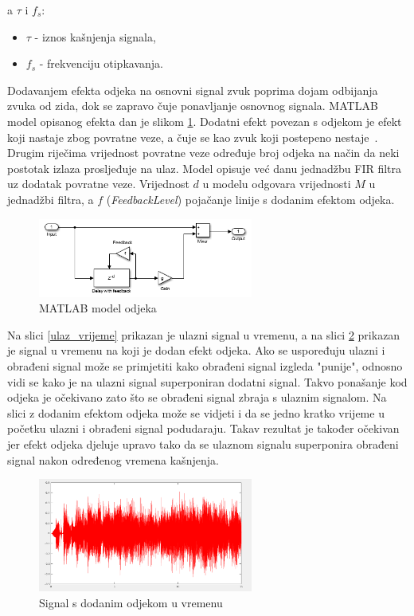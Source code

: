 \documentclass[conference]{IEEEtran}
\begin{document}
a $\tau$ i $f_{s}$:
 \begin{itemize}
   \item{$\tau$ - iznos kašnjenja signala,}
   \item{$f_{s}$ - frekvenciju otipkavanja.}
 \end{itemize}
Dodavanjem efekta odjeka na osnovni signal zvuk poprima dojam odbijanja zvuka od zida, dok se zapravo čuje
ponavljanje osnovnog signala. MATLAB model opisanog efekta dan je slikom \ref{echo_model}. Dodatni efekt povezan
s odjekom je efekt koji nastaje zbog povratne veze, a čuje se kao zvuk koji postepeno nestaje~\cite{b4}. Drugim riječima
vrijednost povratne veze određuje broj odjeka na način da neki postotak izlaza prosljeđuje na ulaz.
Model opisuje već danu jednadžbu FIR filtra uz dodatak povratne veze. Vrijednost $d$ u modelu odgovara vrijednosti
$M$ u jednadžbi filtra, a $f$ (\textit{FeedbackLevel}) pojačanje linije s dodanim efektom odjeka.

\begin{figure}[H]
    \includegraphics[width=200pt]{slike/echo_matlab.png}
    \centering
    \caption{MATLAB model odjeka}
    \label{echo_model}
\end{figure}

Na slici \ref{ulaz_vrijeme} prikazan je ulazni signal u vremenu, a na slici \ref{echo_vrijeme} prikazan je signal
u vremenu na koji je dodan efekt odjeka. Ako se uspoređuju ulazni i obrađeni signal može se primjetiti
kako obrađeni signal izgleda "punije", odnosno vidi se kako je na ulazni signal superponiran dodatni signal.
Takvo ponašanje kod odjeka je očekivano zato što se obrađeni signal zbraja s ulaznim signalom. Na slici z dodanim
efektom odjeka može se vidjeti i da se jedno kratko vrijeme u početku ulazni i obrađeni signal podudaraju. Takav rezultat
je također očekivan jer efekt odjeka djeluje upravo tako da se ulaznom signalu superponira obrađeni signal nakon određenog
vremena kašnjenja.

\begin{figure}[H]
    \includegraphics[width=200pt]{slike/echo_vrijeme.png}
    \centering
    \caption{Signal s dodanim odjekom u vremenu}
    \label{echo_vrijeme}
\end{figure}
\end{document}
